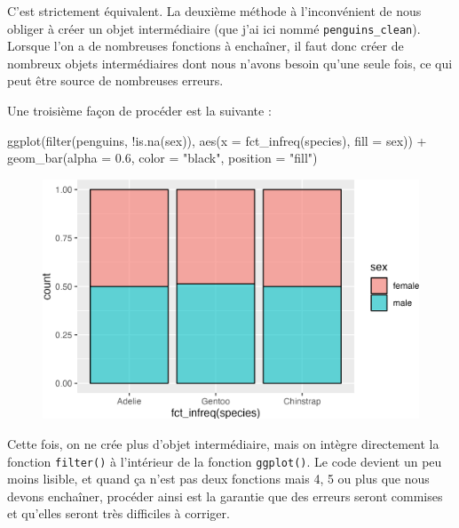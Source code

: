 \documentclass[
  letterpaper,
  DIV=11,
  numbers=noendperiod]{scrreprt}
\newenvironment{Shaded}{\begin{snugshade}}{\end{snugshade}}
\newcommand{\AttributeTok}[1]{\textcolor[rgb]{0.40,0.45,0.13}{#1}}
\newcommand{\FloatTok}[1]{\textcolor[rgb]{0.68,0.00,0.00}{#1}}
\newcommand{\FunctionTok}[1]{\textcolor[rgb]{0.28,0.35,0.67}{#1}}
\newcommand{\NormalTok}[1]{\textcolor[rgb]{0.00,0.23,0.31}{#1}}
\newcommand{\SpecialCharTok}[1]{\textcolor[rgb]{0.37,0.37,0.37}{#1}}
\newcommand{\StringTok}[1]{\textcolor[rgb]{0.13,0.47,0.30}{#1}}
\begin{document}
C'est strictement équivalent. La deuxième méthode à l'inconvénient de
nous obliger à créer un objet intermédiaire (que j'ai ici nommé
\texttt{penguins\_clean}). Lorsque l'on a de nombreuses fonctions à
enchaîner, il faut donc créer de nombreux objets intermédiaires dont
nous n'avons besoin qu'une seule fois, ce qui peut être source de
nombreuses erreurs.

Une troisième façon de procéder est la suivante :

\begin{Shaded}
\begin{Highlighting}[]
\FunctionTok{ggplot}\NormalTok{(}\FunctionTok{filter}\NormalTok{(penguins, }\SpecialCharTok{!}\FunctionTok{is.na}\NormalTok{(sex)), }
       \FunctionTok{aes}\NormalTok{(}\AttributeTok{x =} \FunctionTok{fct\_infreq}\NormalTok{(species), }\AttributeTok{fill =}\NormalTok{ sex)) }\SpecialCharTok{+}
    \FunctionTok{geom\_bar}\NormalTok{(}\AttributeTok{alpha =} \FloatTok{0.6}\NormalTok{, }\AttributeTok{color =} \StringTok{"black"}\NormalTok{, }\AttributeTok{position =} \StringTok{"fill"}\NormalTok{)}
\end{Highlighting}
\end{Shaded}

\begin{figure}[H]

{\centering \includegraphics{./04-DataWrangling_files/figure-pdf/unnamed-chunk-14-1.png}

}

\end{figure}

Cette fois, on ne crée plus d'objet intermédiaire, mais on intègre
directement la fonction \texttt{filter()} à l'intérieur de la fonction
\texttt{ggplot()}. Le code devient un peu moins lisible, et quand ça
n'est pas deux fonctions mais 4, 5 ou plus que nous devons enchaîner,
procéder ainsi est la garantie que des erreurs seront commises et
qu'elles seront très difficiles à corriger.
\end{document}
